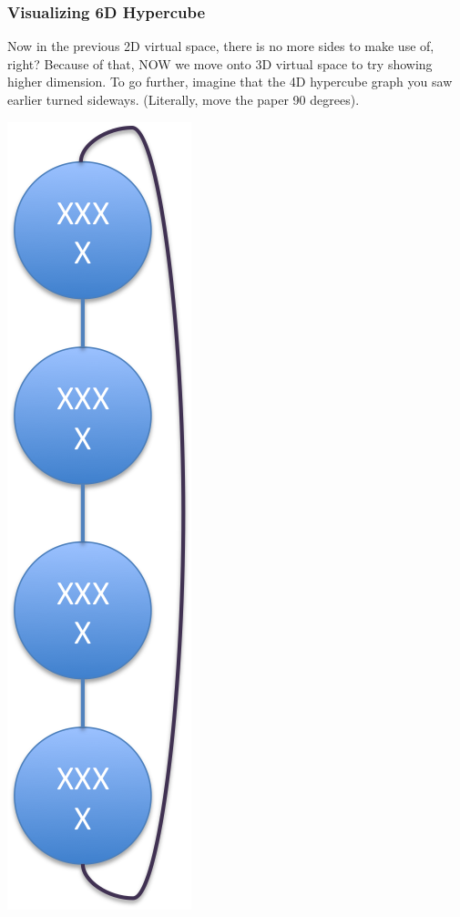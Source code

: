\documentclass[9pt]{beamer}
\begin{document}
\begin{frame}[fragile]
  \frametitle{Visualizing 6D Hypercube}
Now in the previous 2D virtual space, there is no more sides to make use of, right? Because of that, NOW we move onto 3D virtual space to try showing higher dimension. To go further, imagine that the 4D hypercube graph you saw earlier turned sideways. (Literally, move the paper 90 degrees).\\
\begin{center}
  \includegraphics[scale=.25]{4d_hypercube_side}
\end{center}
\end{frame}
\end{document}
